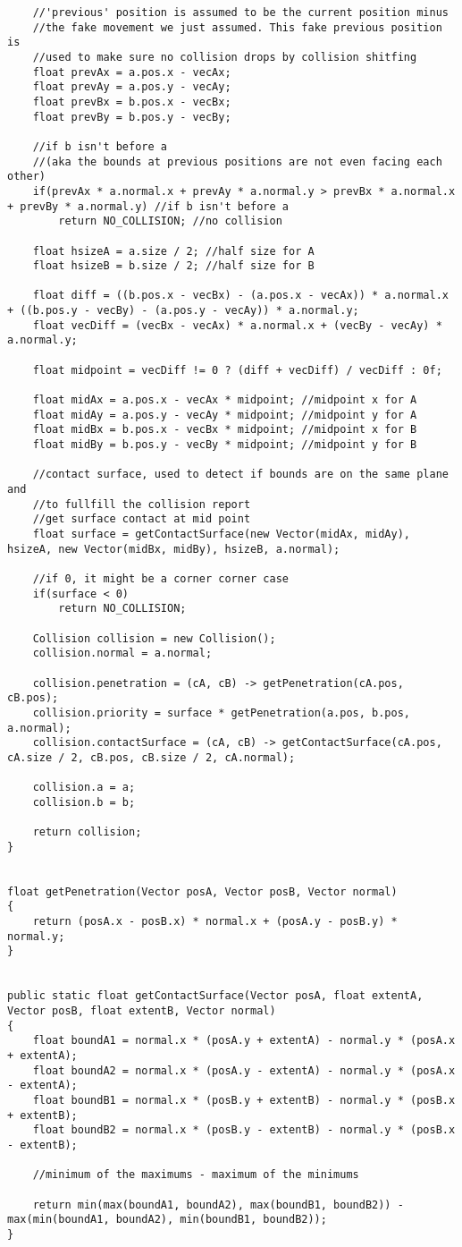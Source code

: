 \documentclass[12pt]{article}
\begin{document}
\begin{lstlisting}
	//'previous' position is assumed to be the current position minus
	//the fake movement we just assumed. This fake previous position is
	//used to make sure no collision drops by collision shitfing
	float prevAx = a.pos.x - vecAx;
	float prevAy = a.pos.y - vecAy;
	float prevBx = b.pos.x - vecBx;
	float prevBy = b.pos.y - vecBy;

	//if b isn't before a
	//(aka the bounds at previous positions are not even facing each other)
	if(prevAx * a.normal.x + prevAy * a.normal.y > prevBx * a.normal.x + prevBy * a.normal.y) //if b isn't before a
		return NO_COLLISION; //no collision

	float hsizeA = a.size / 2; //half size for A
	float hsizeB = b.size / 2; //half size for B

	float diff = ((b.pos.x - vecBx) - (a.pos.x - vecAx)) * a.normal.x + ((b.pos.y - vecBy) - (a.pos.y - vecAy)) * a.normal.y;
	float vecDiff = (vecBx - vecAx) * a.normal.x + (vecBy - vecAy) * a.normal.y;

	float midpoint = vecDiff != 0 ? (diff + vecDiff) / vecDiff : 0f;

	float midAx = a.pos.x - vecAx * midpoint; //midpoint x for A
	float midAy = a.pos.y - vecAy * midpoint; //midpoint y for A
	float midBx = b.pos.x - vecBx * midpoint; //midpoint x for B
	float midBy = b.pos.y - vecBy * midpoint; //midpoint y for B

	//contact surface, used to detect if bounds are on the same plane and
	//to fullfill the collision report
	//get surface contact at mid point
	float surface = getContactSurface(new Vector(midAx, midAy), hsizeA, new Vector(midBx, midBy), hsizeB, a.normal);

	//if 0, it might be a corner corner case
	if(surface < 0)
		return NO_COLLISION;

	Collision collision = new Collision();
	collision.normal = a.normal;

	collision.penetration = (cA, cB) -> getPenetration(cA.pos, cB.pos);
	collision.priority = surface * getPenetration(a.pos, b.pos, a.normal);
	collision.contactSurface = (cA, cB) -> getContactSurface(cA.pos, cA.size / 2, cB.pos, cB.size / 2, cA.normal);

	collision.a = a;
	collision.b = b;

	return collision;
}


float getPenetration(Vector posA, Vector posB, Vector normal)
{
	return (posA.x - posB.x) * normal.x + (posA.y - posB.y) * normal.y;
}


public static float getContactSurface(Vector posA, float extentA, Vector posB, float extentB, Vector normal)
{
	float boundA1 = normal.x * (posA.y + extentA) - normal.y * (posA.x + extentA);
	float boundA2 = normal.x * (posA.y - extentA) - normal.y * (posA.x - extentA);
	float boundB1 = normal.x * (posB.y + extentB) - normal.y * (posB.x + extentB);
	float boundB2 = normal.x * (posB.y - extentB) - normal.y * (posB.x - extentB);
	
	//minimum of the maximums - maximum of the minimums

	return min(max(boundA1, boundA2), max(boundB1, boundB2)) - max(min(boundA1, boundA2), min(boundB1, boundB2));
}
\end{lstlisting}
\end{document}
